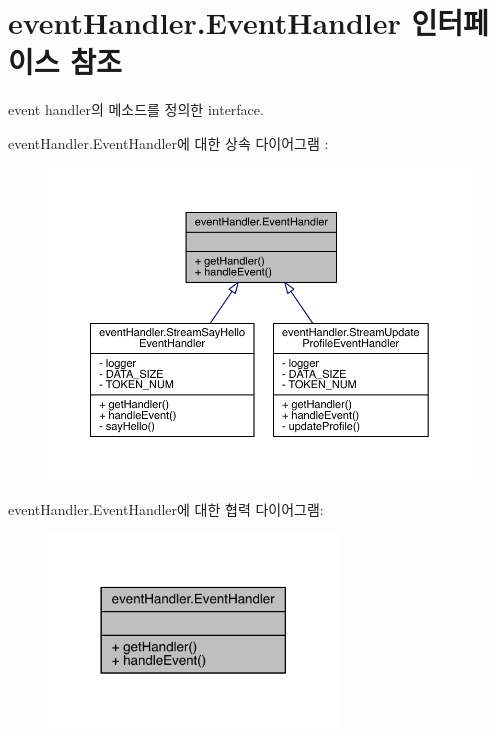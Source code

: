 \hypertarget{interfaceevent_handler_1_1_event_handler}{\section{event\+Handler.\+Event\+Handler 인터페이스 참조}
\label{interfaceevent_handler_1_1_event_handler}
}


event handler의 메소드를 정의한 interface.  




event\+Handler.\+Event\+Handler에 대한 상속 다이어그램 \+: 
\nopagebreak
\begin{figure}[H]
\begin{center}
\leavevmode
\includegraphics[width=350pt]{interfaceevent_handler_1_1_event_handler__inherit__graph}
\end{center}
\end{figure}


event\+Handler.\+Event\+Handler에 대한 협력 다이어그램\+:\nopagebreak
\begin{figure}[H]
\begin{center}
\leavevmode
\includegraphics[width=218pt]{interfaceevent_handler_1_1_event_handler__coll__graph}
\end{center}
\end{figure}
